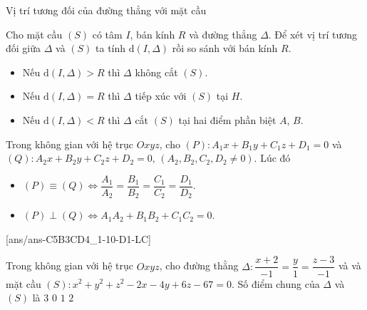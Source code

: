 \begin{dang}{Vị trí tương đối của đường thẳng với mặt cầu}
\begin{center}
	\end{center}
	Cho mặt cầu $(S)$ có tâm $I$, bán kính $R$ và đường thẳng $\Delta$. Để xét vị trí tương đối giữa $\Delta$ và $(S)$ ta tính $\mathrm{d}\left(I,\Delta\right)$ rồi so sánh với bán kính $R$.
	\begin{itemize}
		\item Nếu $\mathrm{d}\left(I,\Delta\right)>R$ thì $\Delta$ không cắt $(S)$.
		\item Nếu $\mathrm{d}\left(I,\Delta\right)=R$ thì $\Delta$ tiếp xúc với $(S)$ tại $H$.
		\item Nếu $\mathrm{d}\left(I,\Delta\right)<R$ thì $\Delta$ cắt $(S)$ tại hai điểm phần biệt $A$, $B$.
	\end{itemize}
	\begin{note}
		Trong không gian với hệ trục $Oxyz$, cho $(P)\colon A_1x+B_1y+C_1z+D_1=0$ và $(Q)\colon A_2x+B_2y+C_2z+D_2=0,\,(A_2,B_2,C_2,D_2\ne 0)$. Lúc đó
		\begin{itemize}
			\item $(P) \equiv (Q) \Leftrightarrow \dfrac{A_1}{A_2}=\dfrac{B_1}{B_2}=\dfrac{C_1}{C_2}=\dfrac{D_1}{D_2}$.
			\item  $(P) \perp(Q) \Leftrightarrow A_1 A_2+B_1 B_2+C_1 C_2=0$.
		\end{itemize} 
	\end{note}
\end{dang}

\TN
{}[ans/ans-C5B3CD4_1-10-D1-LC]
\begin{ex}%
	Trong không gian với hệ trục $Oxyz$, cho đường thằng $\Delta\colon \dfrac{x+2}{-1}=\dfrac{y}{1}=\dfrac{z-3}{-1}$ và và mặt cầu $(S)\colon x^2+y^2+z^2-2 x-4 y+6 z-67=0$. Số điểm chung của $\Delta$ và $(S)$ là \choice
		{$3$}
		{$0$}
		{$1$}
		{\True $2$}
\end{ex}


